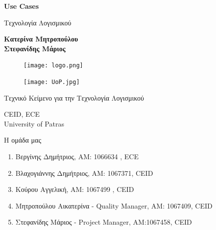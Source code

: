 \documentclass{article}
\begin{document}

\begin{titlepage}
   \begin{center}
       \vspace*{1cm}

       \textbf{\huge Use Cases}

       \vspace{0.5cm}
        Τεχνολογία Λογισμικού
            
       \vspace{1cm}

       \textbf{Κατερίνα Μητροπούλου\\Στεφανίδης Μάριος}
       
       \begin{figure}[!htb]
        \centering
        \texttt{[image: logo.png]}
        \end{figure}
        
        \vspace{0.5cm}
        
        \begin{figure}[!htb]
        \centering
        \texttt{[image: UoP.jpg]}
        \end{figure}


       \vfill
            
       Τεχνικό Κείμενο για την Τεχνολογία Λογισμικού\\
            
       \vspace{0.5cm}
            
       CEID, ECE\\
       University of Patras\\
            
   \end{center}
\end{titlepage}


 \noindent Η ομάδα μας

\begin{enumerate}
  \item Βεργίνης Δημήτριος, ΑΜ: 1066634 , ECE
  \item Βλαχογιάννης Δημήτριος, ΑΜ: 1067371, CEID
  \item Κούρου Αγγελική, ΑΜ: 1067499 , CEID
  \item Μητροπούλου Αικατερίνα - Quality Manager, ΑΜ: 1067409, CEID
  \item Στεφανίδης Μάριος - Project Manager, ΑΜ:1067458, CEID
\end{enumerate}
\end{document}
